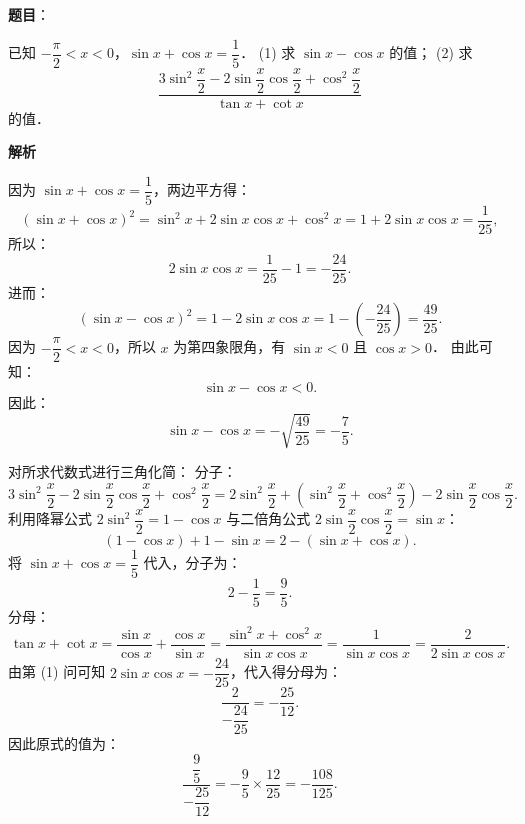 \begin{answer}

\textbf{题目}：

已知 $-\dfrac{\pi}{2} < x < 0$，$\sin x + \cos x = \dfrac{1}{5}$．
(1) 求 $\sin x - \cos x$ 的值；
(2) 求
\nopagebreak[4]
\[
\frac{3\sin^2\dfrac{x}{2} - 2\sin\dfrac{x}{2}\cos\dfrac{x}{2} + \cos^2\dfrac{x}{2}}{\tan x + \cot x}
\]
的值．

\textbf{解析}


因为 $\sin x + \cos x = \dfrac{1}{5}$，两边平方得：
\nopagebreak[4]
\[
(\sin x + \cos x)^2 = \sin^2 x + 2\sin x\cos x + \cos^2 x = 1 + 2\sin x\cos x = \frac{1}{25},
\]
所以：
\nopagebreak[4]
\[
2\sin x\cos x = \frac{1}{25} - 1 = -\frac{24}{25}.
\]
进而：
\nopagebreak[4]
\[
(\sin x - \cos x)^2 = 1 - 2\sin x\cos x = 1 - \left(-\frac{24}{25}\right) = \frac{49}{25}.
\]
因为 $-\dfrac{\pi}{2} < x < 0$，所以 $x$ 为第四象限角，有 $\sin x < 0$ 且 $\cos x > 0$．
由此可知：
\nopagebreak[4]
\[
\sin x - \cos x < 0.
\]
因此：
\nopagebreak[4]
\[
\sin x - \cos x = -\sqrt{\frac{49}{25}} = -\frac{7}{5}.
\]


对所求代数式进行三角化简：
分子：
\nopagebreak[4]
\[
3\sin^2\frac{x}{2} - 2\sin\frac{x}{2}\cos\frac{x}{2} + \cos^2\frac{x}{2} = 2\sin^2\frac{x}{2} + \left(\sin^2\frac{x}{2} + \cos^2\frac{x}{2}\right) - 2\sin\frac{x}{2}\cos\frac{x}{2}.
\]
利用降幂公式 $2\sin^2\dfrac{x}{2} = 1 - \cos x$ 与二倍角公式 $2\sin\dfrac{x}{2}\cos\dfrac{x}{2} = \sin x$：
\nopagebreak[4]
\[
(1 - \cos x) + 1 - \sin x = 2 - (\sin x + \cos x).
\]
将 $\sin x + \cos x = \dfrac{1}{5}$ 代入，分子为：
\nopagebreak[4]
\[
2 - \frac{1}{5} = \frac{9}{5}.
\]
分母：
\nopagebreak[4]
\[
\tan x + \cot x = \frac{\sin x}{\cos x} + \frac{\cos x}{\sin x} = \frac{\sin^2 x + \cos^2 x}{\sin x\cos x} = \frac{1}{\sin x\cos x} = \frac{2}{2\sin x\cos x}.
\]
由第 (1) 问可知 $2\sin x\cos x = -\dfrac{24}{25}$，代入得分母为：
\nopagebreak[4]
\[
\frac{2}{-\dfrac{24}{25}} = -\frac{25}{12}.
\]
因此原式的值为：
\nopagebreak[4]
\[
\frac{\dfrac{9}{5}}{-\dfrac{25}{12}} = -\frac{9}{5} \times \frac{12}{25} = -\frac{108}{125}.
\]



\end{answer}
